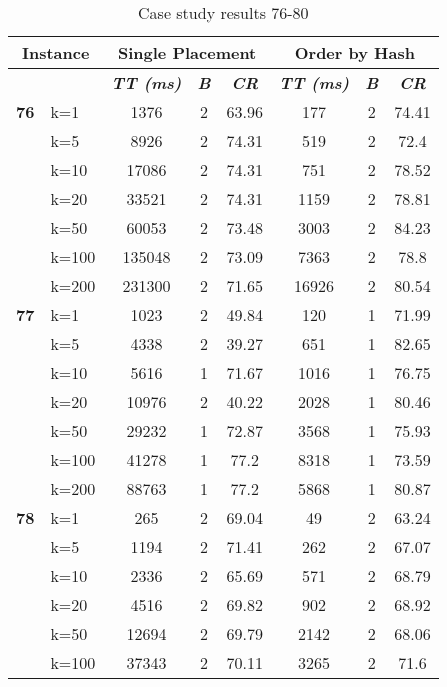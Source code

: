     \begin{table}[htbp]
    \caption{Case study results 76-80}
    \centering
    \begin{tabular}{|l|l|c|c|c|c|c|c|}
    \hline
    \multicolumn{ 2}{|c|}{\textbf{Instance}} & \multicolumn{ 3}{c|}{\textbf{Single Placement}} & \multicolumn{ 3}{c|}{\textbf{Order by Hash}} \\ \hline
    \multicolumn{ 2}{|l|}{} & \textbf{\textit{TT (ms)}} & \textbf{\textit{B}} & \textbf{\textit{CR}} & \textbf{\textit{TT (ms)}} & \textbf{\textit{B}} & \textbf{\textit{CR}} \\ \hline
    \multicolumn{1}{|r|}{\textbf{76}} & k=1 & 1376 & 2 & 63.96 & 177 & 2 & 74.41 \\ 
     & k=5 & 8926 & 2 & 74.31 & 519 & 2 & 72.4 \\ 
     & k=10 & 17086 & 2 & 74.31 & 751 & 2 & 78.52 \\ 
     & k=20 & 33521 & 2 & 74.31 & 1159 & 2 & 78.81 \\ 
     & k=50 & 60053 & 2 & 73.48 & 3003 & 2 & 84.23 \\ 
     & k=100 & 135048 & 2 & 73.09 & 7363 & 2 & 78.8 \\ 
     & k=200 & 231300 & 2 & 71.65 & 16926 & 2 & 80.54 \\ \hline
    \multicolumn{1}{|r|}{\textbf{77}} & k=1 & 1023 & 2 & 49.84 & 120 & 1 & 71.99 \\ 
     & k=5 & 4338 & 2 & 39.27 & 651 & 1 & 82.65 \\ 
     & k=10 & 5616 & 1 & 71.67 & 1016 & 1 & 76.75 \\ 
     & k=20 & 10976 & 2 & 40.22 & 2028 & 1 & 80.46 \\ 
     & k=50 & 29232 & 1 & 72.87 & 3568 & 1 & 75.93 \\ 
     & k=100 & 41278 & 1 & 77.2 & 8318 & 1 & 73.59 \\ 
     & k=200 & 88763 & 1 & 77.2 & 5868 & 1 & 80.87 \\ \hline
    \multicolumn{1}{|r|}{\textbf{78}} & k=1 & 265 & 2 & 69.04 & 49 & 2 & 63.24 \\ 
     & k=5 & 1194 & 2 & 71.41 & 262 & 2 & 67.07 \\ 
     & k=10 & 2336 & 2 & 65.69 & 571 & 2 & 68.79 \\ 
     & k=20 & 4516 & 2 & 69.82 & 902 & 2 & 68.92 \\ 
     & k=50 & 12694 & 2 & 69.79 & 2142 & 2 & 68.06 \\ 
     & k=100 & 37343 & 2 & 70.11 & 3265 & 2 & 71.6 \\ 

\end{tabular}
\end{table}
